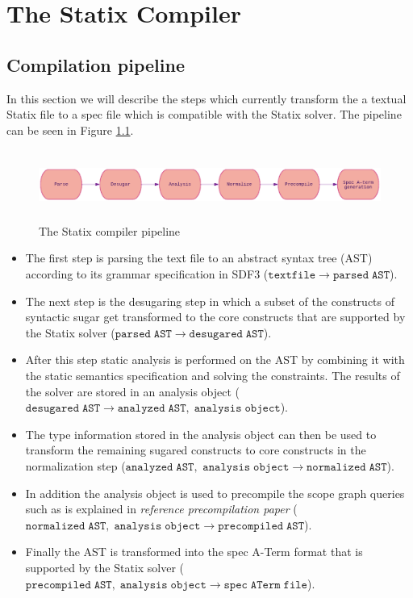 
\chapter{\label{chap:statix-compiler}The Statix Compiler}

\section{Compilation pipeline}
In this section we will describe the steps which currently transform the a textual Statix file to a spec file which is compatible with the Statix solver. The pipeline can be seen in Figure \ref{fig:pipeline}.

\begin{figure}[h]
  \centering
  \includegraphics[height=2.3cm]{img/Statix-compiler-pipeline.eps}
  \caption{The Statix compiler pipeline}
   \label{fig:pipeline}
\end{figure}

\begin{itemize}
\item The first step is parsing the text file to an abstract syntax tree (AST) according to its grammar specification in SDF3 ($\mathtt{textfile \to parsed \; AST}$).
\item The next step is the desugaring step in which a subset of the constructs of syntactic sugar get transformed to the core constructs that are supported by the Statix solver ($\mathtt{parsed \; AST \to desugared \; AST}$).
\item After this step static analysis is performed on the AST by combining it with the static semantics specification and solving the constraints. The results of the solver are stored in an analysis object ($\mathtt{desugared \; AST \to analyzed \; AST, \; analysis \; object}$).
\item The type information stored in the analysis object can then be used to transform the remaining sugared constructs to core constructs in the normalization step ($\mathtt{analyzed \; AST,}$ $\mathtt{analysis \; object \to normalized \; AST}$).
\item In addition the analysis object is used to precompile the scope graph queries such as is explained in \textit{reference precompilation paper} ($\mathtt{normalized \; AST, \; analysis \; object \to precompiled \; AST}$).
\item Finally the AST is transformed into the spec A-Term format that is supported by the Statix solver ($\mathtt{precompiled \; AST, \; analysis \; object \to spec \; ATerm \; file}$).
\end{itemize}



